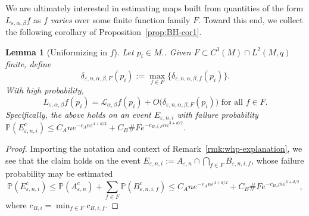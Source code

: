 \documentclass{article}
\let\todo\undefined
\let\todo\undefined
\newcommand{\todo}[1][]{}
\newtheorem{lemma}[theorem]{Lemma}
\theoremstyle{remark}
\theoremstyle{plain}
\begin{document}
We are ultimately interested in estimating maps built from quantities of the form \( L_{\varepsilon, \alpha, \beta} f\) as \( f \) \textit{varies} over some finite function family \( F \). Toward this end, we collect the following corollary of Proposition~\ref{prop:BH-cor1}.

\begin{lemma}[Uniformizing in \( f \)] Let \( p_{i} \in M. \). Given ${F} \subset C^{3}(M) \cap L^{2}(M, q) $ finite, define $$\delta_{\varepsilon, n, \alpha, \beta, {F}}(p_{i}):=\max_{f \in {F}} \{ \delta_{\varepsilon, n, \alpha, \beta, f}(p_{i})\}.$$
 With high probability, 
    \begin{equation}
        L_{\varepsilon, \alpha, \beta}f(p_{i})= \mathcal{L} _{\alpha, \beta}f(p_{i})+ O\big(\delta_{\varepsilon, n, \alpha, \beta ,F}(p_{i})\big) \text{ for all }f \in F.
        \label{eqn:unif-f}
    \end{equation}
    Specifically, the above holds on an event \( E_{\varepsilon, n, i} \) with failure probability \( \mathbb{P}(E_{\varepsilon, n, i}^{c})  \leq C_{A} n e^{-c_{A}n \varepsilon^{4+d/2}}+C_{B} \# F e^{-c_{B, i, F}n \varepsilon^{3+d/2}}\).
    \label{lemma:uniformizing-in-f}
\end{lemma}

\begin{proof}
    Importing the notation and context of Remark~\ref{rmk:whp-explanation}, we see that the claim holds on the event $E_{\varepsilon, n, i}:=A_{\varepsilon, n} \cap \bigcap_{f \in F}^{}B_{\varepsilon, n, i , f}$, whose failure probability may be estimated $$\mathbb{P}(E^{c}_{\varepsilon, n, i}) \leq \mathbb{P}(A_{\varepsilon, n}^{c})+ \sum_{f \in F}\mathbb{P}(B^{c}_{\varepsilon, n,i,f})\leq C_{A} n e^{-c_{A}n \varepsilon^{4+d/2}}+C_{B} \# F e^{-c_{B, i}n \varepsilon^{3+d/2}},$$
where $c_{B,i}=\min_{f \in F} c_{B,i,f}$. 
\end{proof}
\end{document}
